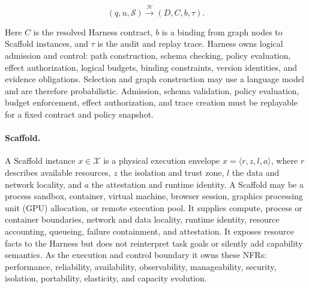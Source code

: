 \documentclass[11pt]{article}
\begin{document}
\begin{equation}
(q,u,\mathcal{S}) \xrightarrow{\mathcal{H}} (D,C,b,\tau).
\end{equation}

Here $C$ is the resolved Harness contract, $b$ is a binding from graph nodes to Scaffold instances, and $\tau$ is the audit and replay trace. Harness owns logical admission and control: path construction, schema checking, policy evaluation, effect authorization, logical budgets, binding constraints, version identities, and evidence obligations. Selection and graph construction may use a language model and are therefore probabilistic. Admission, schema validation, policy evaluation, budget enforcement, effect authorization, and trace creation must be replayable for a fixed contract and policy snapshot.

\paragraph{Scaffold.}
A Scaffold instance $x\in\mathcal{X}$ is a physical execution envelope $x=\langle r,z,l,a\rangle$, where $r$ describes available resources, $z$ the isolation and trust zone, $l$ the data and network locality, and $a$ the attestation and runtime identity. A Scaffold may be a process sandbox, container, virtual machine, browser session, graphics processing unit (GPU) allocation, or remote execution pool. It supplies compute, process or container boundaries, network and data locality, runtime identity, resource accounting, queueing, failure containment, and attestation. It exposes resource facts to the Harness but does not reinterpret task goals or silently add capability semantics. As the execution and control boundary it owns these NFRs: performance, reliability, availability, observability, manageability, security, isolation, portability, elasticity, and capacity evolution.
\end{document}
